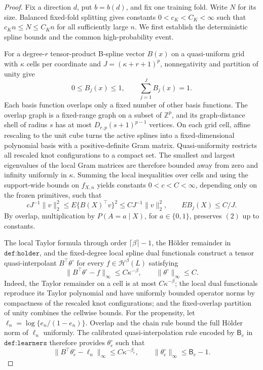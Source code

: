 \documentclass{article}
\begin{document}
\begin{proof}
Fix a direction \(d\), put \(b=b(d)\), and fix one training fold. Write \(N\) for its size. Balanced fixed-fold splitting gives constants \(0<c_K<C_K<\infty\) such that \(c_Kn\le N\le C_Kn\) for all sufficiently large \(n\). We first establish the deterministic spline bounds and the common high-probability event.

For a degree-\(r\) tensor-product B-spline vector \(B(x)\) on a quasi-uniform grid with \(\kappa\) cells per coordinate and \(J=(\kappa+r+1)^p\), nonnegativity and partition of unity give
\[0\le B_j(x)\le1,\qquad \sum_{j=1}^JB_j(x)=1.\tag{1}\]
Each basis function overlaps only a fixed number of other basis functions. The overlap graph is a fixed-range graph on a subset of \(\mathbb Z^p\), and its graph-distance shell of radius \(s\) has at most \(D_{r,p}(s+1)^{p-1}\) vertices. On each grid cell, affine rescaling to the unit cube turns the active splines into a fixed-dimensional polynomial basis with a positive-definite Gram matrix. Quasi-uniformity restricts all rescaled knot configurations to a compact set. The smallest and largest eigenvalues of the local Gram matrices are therefore bounded away from zero and infinity uniformly in \(\kappa\). Summing the local inequalities over cells and using the support-wide bounds on \(f_{X,n}\) yields constants \(0<c<C<\infty\), depending only on the frozen primitives, such that
\[cJ^{-1}\lVert v\rVert_2^2\le E\{B(X)^\top v\}^2\le CJ^{-1}\lVert v\rVert_2^2,\qquad EB_j(X)\le C/J.\tag{2}\]
By overlap, multiplication by \(P(A=a\mid X)\), for \(a\in\{0,1\}\), preserves \((2)\) up to constants.

The local Taylor formula through order \(\lceil\beta\rceil-1\), the H\"older remainder in \(\texttt{def:holder}\), and the fixed-degree local spline dual functionals construct a tensor quasi-interpolant \(B^\top\theta^\circ\) for every \(f\in\mathcal H^\beta(L)\) satisfying
\[\lVert B^\top\theta^\circ-f\rVert_\infty\le C\kappa^{-\beta},\qquad \lVert\theta^\circ\rVert_\infty\le C.\tag{3}\]
Indeed, the Taylor remainder on a cell is at most \(C\kappa^{-\beta}\); the local dual functionals reproduce its Taylor polynomial and have uniformly bounded operator norms by compactness of the rescaled knot configurations; and the fixed-overlap partition of unity combines the cellwise bounds. For the propensity, let \(\ell_n=\log\{e_n/(1-e_n)\}\). Overlap and the chain rule bound the full H\"older norm of \(\ell_n\) uniformly. The calibrated quasi-interpolation rule encoded by \(\mathsf B_e\) in \(\texttt{def:learners}\) therefore provides \(\theta_e^\circ\) such that
\[\lVert B^\top\theta_e^\circ-\ell_n\rVert_\infty\le C\kappa^{-\beta_e},\qquad \lVert\theta_e^\circ\rVert_\infty\le\mathsf B_e-1.\tag{4}\]


\end{proof}
\end{document}
